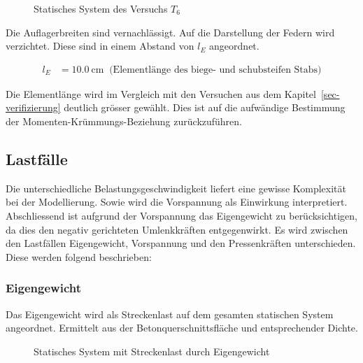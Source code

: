 \documentclass[
  11pt,
  letterpaper,
]{scrreprt}
\begin{document}
\begin{figure}[H]


\caption{\label{fig-system_t6}Statisches System des Versuchs \(T_6\)}

\end{figure}%

Die Auflagerbreiten sind vernachlässigt. Auf die Darstellung der Federn
wird verzichtet. Diese sind in einem Abstand von \(l_E\) angeordnet.

$$
\begin{aligned}
l_{E} &= 10.0\ \mathrm{cm} \; \;\textrm{(Elementlänge des biege- und schubsteifen Stabs)}
\end{aligned}
$$

Die Elementlänge wird im Vergleich mit den Versuchen aus dem
Kapitel~\ref{sec-verifizierung} deutlich grösser gewählt. Dies ist auf
die aufwändige Bestimmung der Momenten-Krümmungs-Beziehung
zurückzuführen.

\subsection{Lastfälle}\label{lastfuxe4lle}

Die unterschiedliche Belastungsgeschwindigkeit liefert eine gewisse
Komplexität bei der Modellierung. Sowie wird die Vorspannung als
Einwirkung interpretiert. Abschliessend ist aufgrund der Vorspannung das
Eigengewicht zu berücksichtigen, da dies den negativ gerichteten
Umlenkkräften entgegenwirkt. Es wird zwischen den Lastfällen
Eigengewicht, Vorspannung und den Pressenkräften unterschieden. Diese
werden folgend beschrieben:

\subsubsection{Eigengewicht}\label{eigengewicht}

Das Eigengewicht wird als Streckenlast auf dem gesamten statischen
System angeordnet. Ermittelt aus der Betonquerschnittsfläche und
entsprechender Dichte.

\begin{figure}[H]


\caption{\label{fig-t6_lastfall_eg}Statisches System mit Streckenlast
durch Eigengewicht}

\end{figure}%
\end{document}
